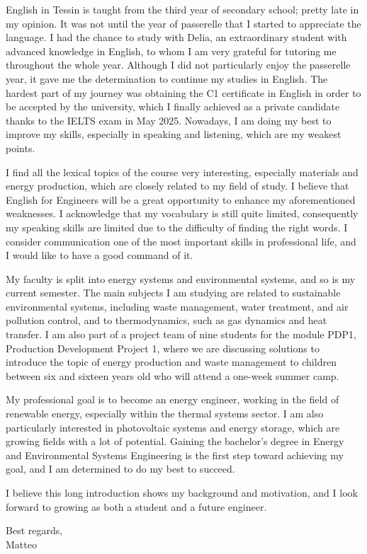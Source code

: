 \documentclass{article}
\begin{document}
English in Tessin is taught from the third year of secondary school; pretty late in my opinion.
It was not until the year of passerelle that I started to appreciate the language. I had
the chance to study with Delia, an extraordinary student with advanced knowledge in English,
to whom I am very grateful for tutoring me throughout the whole year.
Although I did not particularly enjoy the passerelle year, it gave me the determination to
continue my studies in English.
The hardest part of my journey was obtaining the C1 certificate in English in order
to be accepted by the university, which I finally achieved as a private candidate thanks to
the IELTS exam in May 2025.
Nowadays, I am doing my best to improve my skills, especially in speaking and listening,
which are my weakest points.

I find all the lexical topics of the course very interesting, especially materials and
energy production, which are closely related to my field of study.
I believe that English for Engineers will be a great opportunity to enhance my
aforementioned weaknesses.
I acknowledge that my vocabulary is still quite limited, consequently my speaking skills
are limited due to the difficulty of finding the right words. I consider communication one of
the most important skills in professional life, and I would like to have a good command of it.

My faculty is split into energy systems and environmental systems, and so is my current
semester. The main subjects I am studying are related to sustainable environmental
systems, including waste management, water treatment, and air pollution control, and
to thermodynamics, such as gas dynamics and heat transfer.
I am also part of a project team of nine students for the module PDP1, Production
Development Project 1, where we are discussing solutions to introduce the topic of
energy production and waste management to children between six and sixteen years old who
will attend a one-week summer camp.

My professional goal is to become an energy engineer, working in the field of renewable
energy, especially within the thermal systems sector. I am also particularly interested
in photovoltaic systems and energy storage, which are growing fields with a lot of
potential.
Gaining the bachelor's degree in Energy and Environmental Systems Engineering is the first
step toward achieving my goal, and I am determined to do my best to succeed.

I believe this long introduction shows my background and motivation, and I look forward
to growing as both a student and a future engineer.
\setlength{\parskip}{1.5em}

Best regards,\\
Matteo
\end{document}
